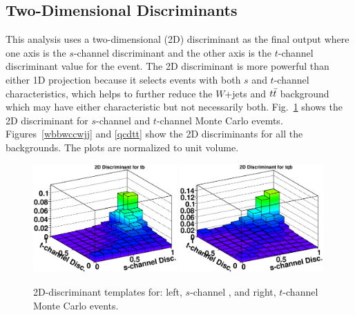 \clearpage
\subsection{Two-Dimensional Discriminants}

This analysis uses a two-dimensional (2D) discriminant as the final output where one axis is the $s$-channel discriminant and the other axis is the $t$-channel discriminant value for the event. The 2D discriminant is more powerful than either 1D
projection because it selects events with both $s$ and $t$-channel
characteristics, which helps to further reduce the $W$+jets and
$\mbox{$t\bar{t}$}$ background which may have either characteristic but not
necessarily both. Fig.~\ref{tbtqb} shows the 2D discriminant for $s$-channel and $t$-channel Monte Carlo evemts. Figures~\ref{wbbwccwjj} and \ref{qcdtt} show the 2D discriminants for all the backgrounds. The plots are normalized to unit volume.

\begin{figure}[!h!tbp]
\includegraphics[width=0.49\textwidth]
{eps/MatrixElement/performance/2D-Discriminant_schannel}
\includegraphics[width=0.49\textwidth]
{eps/MatrixElement/performance/2D-Discriminant_tchannel}
\vspace{-0.1in}
\caption{2D-discriminant templates for: left, $s$-channel , and
right, $t$-channel Monte Carlo events.}
\label{tbtqb}
\end{figure}

